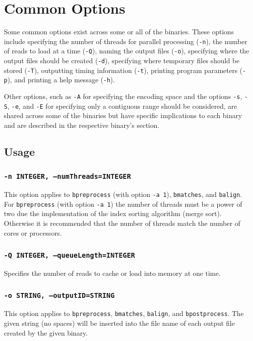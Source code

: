 \documentclass[a4paper,12pt]{book}
\newcommand{\TT}[1]{{\tt #1}} %
\begin{document}
\section{Common Options}
\label{sec:commonoptions}
Some common options exist across some or all of the binaries. 
These options include specifying the number of threads for parallel processing (\TT{-n}), the number of reads to load at a time (\TT{-Q}), naming the output files (\TT{-o}), specifying where the output files should be created (\TT{-d}), specifying where temporary files should be stored (\TT{-T}), outputting timing information (\TT{-t}), printing program parameters (\TT{-p}), and printing a help message (\TT{-h}).

Other options, such as \TT{-A} for specifying the encoding space and the options \TT{-s}, \TT{-S}, \TT{-e}, and \TT{-E} for specifying only a contiguous range should be considered, are shared across some of the binaries but have specific implications to each binary and are described in the respective binary's section.

\subsection{Usage}
\subsubsection{\TT{-n INTEGER, --numThreads=INTEGER}}
This option applies to \TT{bpreprocess} (with option \TT{-a 1}), \TT{bmatches}, and \TT{balign}. 
For \TT{bpreprocess} (with option \TT{-a 1}) the number of threads must be a power of two due the implementation of the index sorting algorithm (merge sort).
Otherwise it is recommended that the number of threads match the number of cores or processors.

\subsubsection{\TT{-Q INTEGER, --queueLength=INTEGER}}
Specifies the number of reads to cache or load into memory at one time.

\subsubsection{\TT{-o STRING, --outputID=STRING}}
This option applies to \TT{bpreprocess}, \TT{bmatches}, \TT{balign}, and \TT{bpostprocess}.
The given string (no spaces) will be inserted into the file name of each output file created by the given binary.
\end{document}
